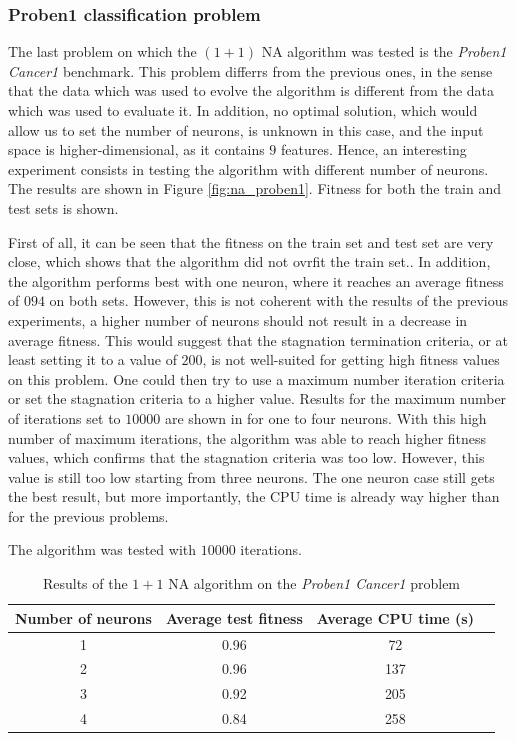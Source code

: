 \subsubsection{Proben1 classification problem}

The last problem on which the $(1 + 1)$ NA algorithm was tested is the \textit{Proben1 Cancer1} benchmark. This problem differrs from the previous ones, in the sense that the data which
was used to evolve the algorithm is different from the data which was used to evaluate it. In addition, no optimal solution, which would allow us to set the number of neurons, is unknown in this case,
and the input space is higher-dimensional, as it contains $9$ features. Hence, an interesting experiment consists in testing the algorithm with different number of neurons.
The results are shown in Figure \ref{fig:na_proben1}. Fitness for both the train and test sets is shown.

First of all, it can be seen that the fitness on the train set and test set are very close, which shows that the algorithm did not ovrfit the train set.. In addition, the algorithm performs
best with one neuron, where it reaches an average fitness of $094$ on both sets. However, this is not coherent with the results of the previous experiments, a higher number of neurons should
not result in a decrease in average fitness. This would suggest that the stagnation termination criteria, or at least setting it to a value of $200$, is not well-suited for getting high fitness values
on this problem. One could then try to use a maximum number iteration criteria or set the stagnation criteria to a higher value. Results for the maximum number of iterations set to $10000$ are shown in
 for one to four neurons. With this high number of maximum iterations, the algorithm was able to reach higher fitness values, which confirms that the stagnation criteria was too low.
However, this value is still too low starting from three neurons. The one neuron case still gets the best result, but more importantly, the CPU time is already way higher than for the previous problems.

\begin{table}
    \caption{Results of the $1 + 1$ NA algorithm on the \textit{Proben1 Cancer1} problem}{The algorithm was tested with $10000$ iterations.}
    \centering
    \label{tab:na_proben1}
    \begin{tabular}{ |c|c|c|c| }
        \hline
        Number of neurons & Average test fitness & Average CPU time (s) \\
        \hline
        1 & 0.96 & 72 \\
        \hline
        2 & 0.96 & 137 \\
        \hline
        3 & 0.92 & 205 \\
        \hline
        4 & 0.84 & 258 \\
        \hline\hline
    \end{tabular}
\end{table}

